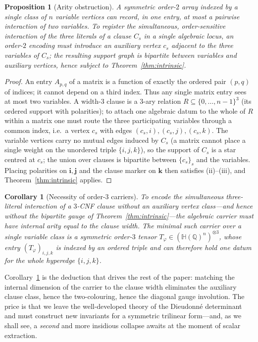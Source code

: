 \documentclass[pdflatex,sn-mathphys-num]{sn-jnl}
\theoremstyle{thmstyleone}%
\newtheorem{proposition}[theorem]{Proposition}%
\newtheorem{corollary}[theorem]{Corollary}%
\theoremstyle{thmstyletwo}%
\theoremstyle{thmstylethree}%
\newcommand{\HH}{\mathbb{H}}
\newcommand{\QQ}{\mathbb{Q}}
\newcommand{\bi}{\mathbf{i}}
\newcommand{\bj}{\mathbf{j}}
\newcommand{\bk}{\mathbf{k}}
\newcommand{\Tphi}{T_{\varphi}}
\begin{document}
\begin{proposition}[Arity obstruction]\label{prop:arity}
A symmetric order-$2$ array indexed by a single class of $n$ variable
vertices can record, in one entry, at most a \emph{pairwise} interaction of
two variables. To register the simultaneous, order-sensitive interaction of
the three literals of a clause $C_s$ in a single algebraic locus, an
order-$2$ encoding must introduce an auxiliary vertex $c_s$ adjacent to the
three variables of $C_s$; the resulting support graph is bipartite between
variables and auxiliary vertices, hence subject to
Theorem~\ref{thm:intrinsic}.
\end{proposition}

\begin{proof}
An entry $A_{p,q}$ of a matrix is a function of exactly the ordered pair
$(p,q)$ of indices; it cannot depend on a third index. Thus any single
matrix entry sees at most two variables. A width-$3$ clause is a $3$-ary
relation $R\subseteq\{0,\dots,n-1\}^3$ (its ordered support with polarities);
to attach one algebraic datum to the whole of $R$ within a matrix one must
route the three participating variables through a common index, i.e.\ a
vertex $c_s$ with edges $(c_s,i),(c_s,j),(c_s,k)$. The variable vertices
carry no mutual edges induced by $C_s$ (a matrix cannot place a single
weight on the unordered triple $\{i,j,k\}$), so the support of $C_s$ is a
star centred at $c_s$; the union over clauses is bipartite between
$\{c_s\}_s$ and the variables. Placing polarities on $\bi,\bj$ and the
clause marker on $\bk$ then satisfies (ii)--(iii), and
Theorem~\ref{thm:intrinsic} applies.
\end{proof}

\begin{corollary}[Necessity of order-$3$ carriers]\label{cor:necessity}
To encode the simultaneous three-literal interaction of a $3$-CNF clause
without an auxiliary vertex class---and hence without the bipartite gauge
of Theorem~\ref{thm:intrinsic}---the algebraic carrier must have internal
arity equal to the clause width. The minimal such carrier over a single
variable class is a symmetric order-$3$ tensor
$\Tphi\in(\HH(\QQ)^n)^{\otimes3}$, whose entry $(\Tphi)_{i,j,k}$ is indexed
by an ordered triple and can therefore hold one datum for the whole
hyperedge $\{i,j,k\}$.
\end{corollary}

Corollary~\ref{cor:necessity} is the deduction that drives the rest of the
paper: matching the internal dimension of the carrier to the clause width
eliminates the auxiliary clause class, hence the two-colouring, hence the
diagonal gauge involution. The price is that we leave the well-developed
theory of the Dieudonn\'e determinant and must construct new invariants for
a symmetric trilinear form---and, as we shall see, a \emph{second} and more
insidious collapse awaits at the moment of scalar extraction.
\end{document}
